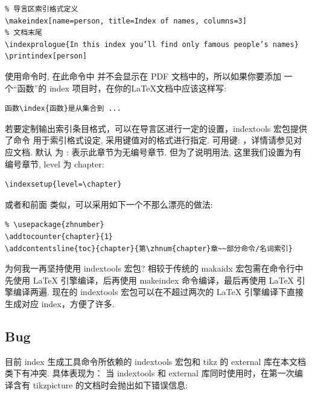 \begin{verbatim}
% 导言区索引格式定义
\makeindex[name=person, title=Index of names, columns=3]
% 文档末尾
\indexprologue{In this index you’ll find only famous people’s names}
\printindex[person]
\end{verbatim}


使用命令时, 在此命令中  并不会显示在 PDF 文档中的，所以如果你要添加
一个``函数''的 index 项目时，在你的\LaTeX{}文档中应该这样写:

\begin{verbatim}
函数\index{函数}是从集合到 ...
\end{verbatim}

若要定制\cmd[F]{\printindex}输出索引条目格式，可以在导言区进行一定的设置，{indextools}
宏包提供了命令 \cmd[F]{\indexsetup{}} 用于索引格式设定, 采用键值对的格式进行指定. 可用键:
，详情请参见对应文档. 默认  为 :
表示此章节为无编号章节. 但为了说明用法, 这里我们设置为有编号章节, level 为 chapter:
\begin{verbatim}
\indexsetup{level=\chapter}
\end{verbatim}

或者和前面 \cmd{\printbibliography} 类似，可以采用如下一个不那么漂亮的做法:
\begin{verbatim}
% \usepackage{zhnumber}
\addtocounter{chapter}{1}
\addcontentsline{toc}{chapter}{第\zhnum{chapter}章~~部分命令/名词索引}
\end{verbatim}

为何我一再坚持使用 {indextools} 宏包? 相较于传统的 {makaidx} 宏包需在命令行中
先使用 \LaTeX{} 引擎编译，后再使用 {makeindex} 命令编译，最后再使用 \LaTeX{} 引擎编译两遍.
现在的 {indextools} 宏包可以在不超过两次的 \LaTeX{} 引擎编译下直接生成对应 index，方便了许多.

\subsection{Bug}
目前 index 生成工具命令所依赖的 indextools 宏包和 tikz 的 external 库在本文档类下有冲突. 具体表现为：
当 {indextools} 和 {external} 库同时使用时，在第一次编译含有 tikzpicture 的文档时会抛出如下错误信息:

